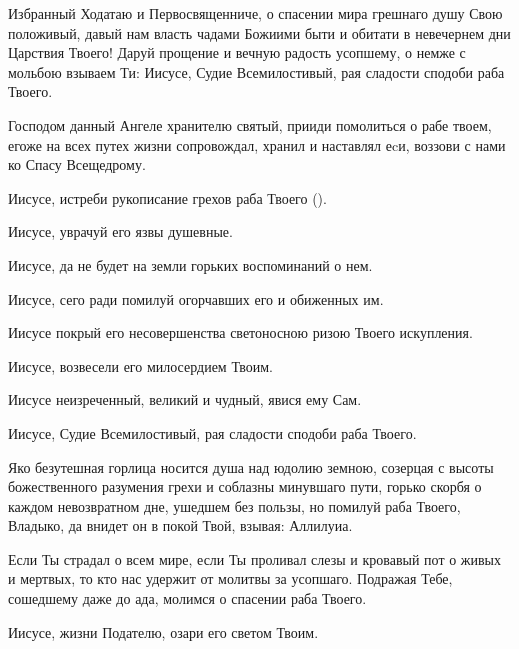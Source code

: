\begin{mymulticols}
 




Избранный Ходатаю и Первосвященниче, о спасении мира грешнаго душу Свою положивый, давый нам власть чадами Божиими быти и обитати в невечернем дни Царствия Твоего! Даруй прощение и вечную радость усопшему, о немже с мольбою взываем Ти: Иисусе, Судие Всемилостивый, рая сладости сподоби раба Твоего.




Господом данный Ангеле хранителю святый, прииди помолиться о рабе твоем, егоже на всех путех жизни сопровождал, хранил и наставлял еcи, воззови с нами ко Спасу Всещедрому. 

Иисусе, истреби рукописание грехов раба Твоего (). 

Иисусе, уврачуй его язвы душевные. 

Иисусе, да не будет на земли горьких воспоминаний о нем. 

Иисусе, сего ради помилуй огорчавших его и обиженных им. 

Иисусе покрый его несовершенства светоносною ризою Твоего искупления. 

Иисусе, возвесели его милосердием Твоим. 

Иисусе неизреченный, великий и чудный, явися ему Сам. 

Иисусе, Судие Всемилостивый, рая сладости сподоби раба Твоего.




Яко безутешная горлица носится душа над юдолию земною, созерцая с высоты божественного разумения грехи и соблазны минувшаго пути, горько скорбя о каждом невозвратном дне, ушедшем без пользы, но помилуй раба Твоего, Владыко, да внидет он в покой Твой, взывая: Аллилуиа.




Если Ты страдал о всем мире, если Ты проливал слезы и кровавый пот о живых и мертвых, то кто нас удержит от молитвы за усопшаго. Подражая Тебе, сошедшему даже до ада, молимся о спасении раба Твоего. 

Иисусе, жизни Подателю, озари его светом Твоим. 


\end{mymulticols}
